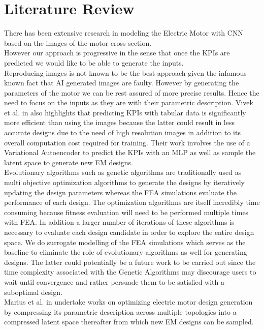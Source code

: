 \documentclass{report} %
\begin{document}
\chapter{Literature Review} 
There has been extensive research in modeling the Electric Motor with \ac{CNN} based on the images of the motor cross-section. \\
However our approach is progressive in the sense that once the \ac{KPI}s are predicted we would like to be able to generate the inputs.\\
Reproducing images is not known to be the best approach given the infamous known fact that AI generated images are faulty. 
However by generating the parameters of the motor we can be rest assured of more precise results. 
Hence the need to focus on the inputs as they are with their parametric description.
Vivek et al. in \cite{VAE-MT-2021} also highlights that predicting \ac{KPI}s with tabular data is significantly more efficient than using the images because the latter could result 
in less accurate designs due to the need of high resolution images in addition to its overall computation cost required for training. Their work 
involves the use of a Variational Autoencoder to predict the \ac{KPI}s with an \ac{MLP} as well as sample the latent space to generate new \ac{EM} designs.\\
Evolutionary algorithms such as genetic algorithms are traditionally used as multi objective optimization algorithms to generate the designs by iteratively
updating the design parameters whereas the \ac{FEA} simulations evaluate the performance of each design. 
The optimization algorithms are itself incredibly time consuming because fitness evaluation will need to be performed multiple times with \ac{FEA}.
In addition a larger number of iterations of these algorithms is necessary to evaluate each design candidate in order to explore the entire design space.
We do surrogate modelling of the \ac{FEA} simulations which serves as the baseline to eliminate the role of evolutionary algorithms as well for generating designs.
The latter could potentially be a future work to be carried out since the time complexity associated with the Genetic Algorithms 
may discourage users to wait until convergence and rather persuade them to be satisfied with a suboptimal design.\\
Marius et al. in \cite{VAE-MT-2021} undertake works on optimizing electric motor design generation by compressing its parametric description 
across multiple topologies into a compressed latent space thereafter from which new \ac{EM} designs can be sampled.
\end{document}
